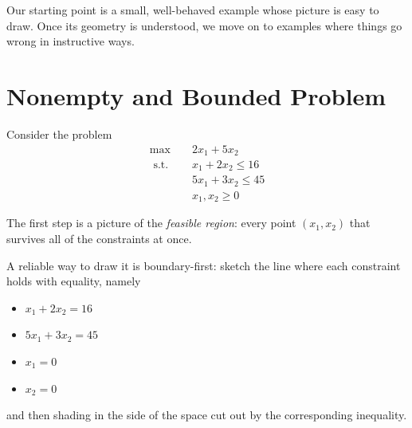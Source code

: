 Our starting point is a small, well-behaved example whose picture is easy to draw.  Once its geometry is understood, we move on to examples where things go wrong in instructive ways.


\section{Nonempty and Bounded Problem}\label{sec:nonempty-bounded}

Consider the problem
\begin{align*}
\max \quad & 2 x_1+5 x_2 \\
\text { s.t. } \quad
&x_1+2 x_2 \leq 16 \\
&5 x_1+3 x_2 \leq  45 \\
&x_1, x_2  \geq 0
\end{align*}

The first step is a picture of the \emph{feasible region}: every point $(x_1, x_2)$ that survives all of the constraints at once.

A reliable way to draw it is boundary-first: sketch the line where each constraint holds with equality, namely
\begin{itemize}
\item $x_1+2 x_2 = 16$
\item $5 x_1+3 x_2 = 45$
\item $x_1 = 0$
\item $x_2= 0$
\end{itemize}
and then shading in the side of the space cut out by the corresponding inequality.


